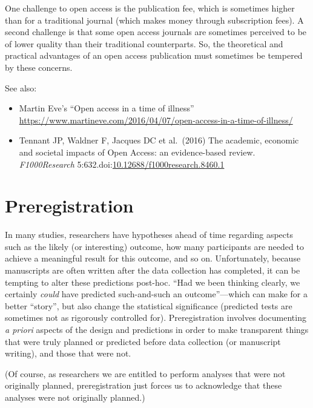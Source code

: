 \documentclass[letterpaper,oneside,11pt,article, portrait]{memoir}
\newcommand{\doi}[1]{doi:\href{http://dx.doi.org/#1}{#1}}
\newcommand{\journal}[1]{\textit{#1}} 			%
\begin{document}
One challenge to open access is the publication fee, which is sometimes higher than for a traditional journal (which makes money through subscription fees). A second challenge is that some open access journals are sometimes perceived to be of lower quality than their traditional counterparts. So, the theoretical and practical advantages of an open access publication must sometimes be tempered by these concerns.

\vspace{1em} \noindent See also:

\begin{itemize}
\item Martin Eve's ``Open access in a time of illness'' \newline \url{https://www.martineve.com/2016/04/07/open-access-in-a-time-of-illness/}
\item Tennant JP, Waldner F, Jacques DC et al.\ (2016) The academic, economic and societal impacts of Open Access: an evidence-based review. \journal{F1000Research} 5:632.\newline \doi{10.12688/f1000research.8460.1}
\end{itemize}



\chapter{Preregistration} \label{prereg}

In many studies, researchers have hypotheses ahead of time regarding aspects such as the likely (or interesting) outcome, how many participants are needed to achieve a meaningful result for this outcome, and so on. Unfortunately, because manuscripts are often written after the data collection has completed, it can be tempting to alter these predictions post-hoc. ``Had we been thinking clearly, we certainly {\itshape could} have predicted such-and-such an outcome''---which can make for a better ``story'', but also change the statistical significance (predicted tests are sometimes not as rigorously controlled for). Preregistration involves documenting {\itshape a priori} aspects of the design and predictions in order to make transparent things that were truly planned or predicted before data collection (or manuscript writing), and those that were not.

(Of course, as researchers we are entitled to perform analyses that were not originally planned, preregistration just forces us to acknowledge that these analyses were not originally planned.)
\end{document}
